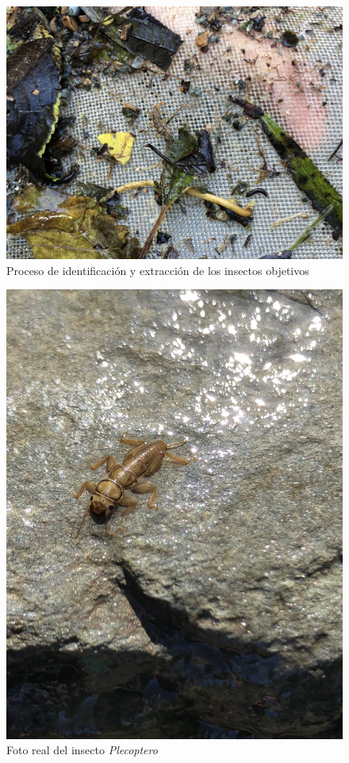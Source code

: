 		\begin{figure}[H]
			\centering
				\includegraphics[width=1\textwidth]{imagenes/testAlpha/4.jpg}
					\caption{Proceso de identificación y extracción de los insectos objetivos}
		\end{figure}
		\begin{figure}[H]
			\centering
				\includegraphics[width=1\textwidth]{imagenes/testAlpha/5.jpg}
					\caption{Foto real del insecto \textit{Plecoptero}}
		\end{figure}

